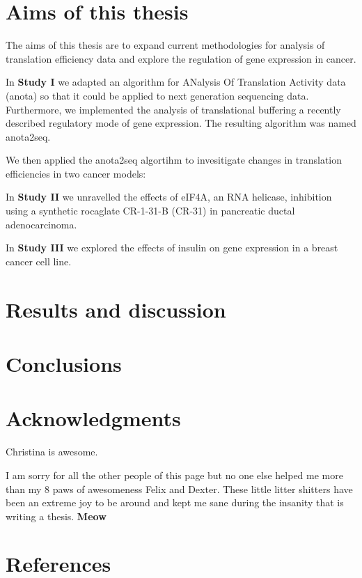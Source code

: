 \documentclass[12pt,openany]{book}
\begin{document}
\chapter{Aims of this thesis}

The aims of this thesis are to expand current methodologies for analysis
of translation efficiency data and explore the regulation of gene
expression in cancer.

In \textbf{Study I} we adapted an algorithm for ANalysis Of Translation
Activity data (anota) so that it could be applied to next generation
sequencing data. Furthermore, we implemented the analysis of
translational buffering a recently described regulatory mode of gene
expression. The resulting algorithm was named anota2seq.

We then applied the anota2seq algortihm to invesitigate changes in
translation efficiencies in two cancer models:

In \textbf{Study II} we unravelled the effects of eIF4A, an RNA
helicase, inhibition using a synthetic rocaglate CR-1-31-B (CR-31) in
pancreatic ductal adenocarcinoma.

In \textbf{Study III} we explored the effects of insulin on gene
expression in a breast cancer cell line.

\chapter{Results and discussion}

\chapter{Conclusions}

\chapter*{Acknowledgments}\label{acknowledgments}

Christina is awesome.

I am sorry for all the other people of this page but no one else helped
me more than my 8 paws of awesomeness Felix and Dexter. These little
litter shitters have been an extreme joy to be around and kept me sane
during the insanity that is writing a thesis. \textbf{Meow}

\chapter*{References}\label{references}
\end{document}
